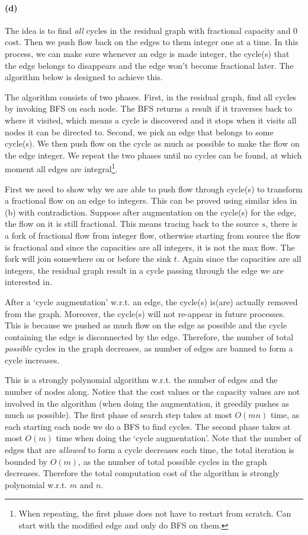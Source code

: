 \documentclass[12pt]{article}
\begin{document}
\paragraph{(d)} The idea is to find \emph{all} cycles in the residual graph with fractional capacity and 0 cost. Then we push flow back on the edges to them integer one at a time. In this process, we can make sure whenever an edge is made integer, the cycle(s) that the edge belongs to disappears and the edge won't become fractional later. The algorithm below is designed to achieve this.

The algorithm consists of two phases. First, in the residual graph, find all cycles by invoking BFS on each node. The BFS returns a result if it traverses back to where it visited, which means a cycle is discovered and it stops when it visits all nodes it can be directed to. Second, we pick an edge that belongs to some cycle(s). We then push flow on the cycle as much as possible to make the flow on the edge integer. We repeat the two phases until no cycles can be found, at which moment all edges are integral\footnote{When repeating, the first phase does not have to restart from scratch. Can start with the modified edge and only do BFS on them.}.

First we need to show why we are able to push flow through cycle(s) to transform a fractional flow on an edge to integers. This can be proved using similar idea in (b) with contradiction. Suppose after augmentation on the cycle(s) for the edge, the flow on it is still fractional. This means tracing back to the source $s$, there is a fork of fractional flow from integer flow, otherwise starting from source the flow is fractional and since the capacities are all integers, it is not the max flow. The fork will join somewhere on or before the sink $t$. Again since the capacities are all integers, the residual graph result in a cycle passing through the edge we are interested in.

After a `cycle augmentation' w.r.t. an edge, the cycle(s) is(are) actually removed from the graph. Moreover, the cycle(s) will not re-appear in future processes. This is because we pushed as much flow on the edge as possible and the cycle containing the edge is disconnected by the edge. Therefore, the number of total \emph{possible} cycles in the graph decreases, as number of edges are banned to form a cycle increases. 

This is a strongly polynomial algorithm w.r.t. the number of edges and the number of nodes along. Notice that the cost values or the capacity values are not involved in the algorithm (when doing the augmentation, it greedily pushes as much as possible). The first phase of search step takes at most $O(mn)$ time, as each starting each node we do a BFS to find cycles. The second phase takes at most $O(m)$ time when doing the `cycle augmentation'. Note that the number of edges that are \emph{allowed} to form a cycle decreases each time, the total iteration is bounded by $O(m)$, as the number of total possible cycles in the graph decreases. Therefore the total computation cost of the algorithm is strongly polynomial w.r.t. $m$ and $n$.
\end{document}
